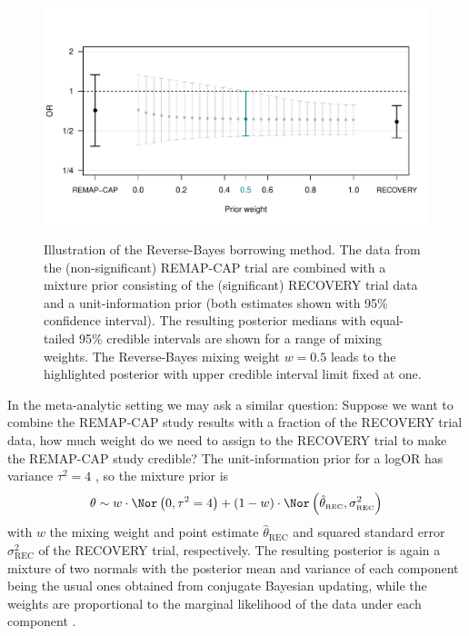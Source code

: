 \begin{figure}[!htb]
\begin{knitrout}
  \color{fgcolor}
{\centering \includegraphics[width=\maxwidth]{images/paper4/advocacy-borrowing-1}
}
\end{knitrout}
\caption{Illustration of the Reverse-Bayes borrowing method. The data from the
  (non-significant) REMAP-CAP trial are combined with a mixture prior consisting
  of the (significant) RECOVERY trial data and a unit-information prior (both
  estimates shown with 95\% confidence interval). The resulting posterior
  medians with equal-tailed 95\% credible intervals are shown for a range of
  mixing weights. The Reverse-Bayes mixing weight $w = 0.5$ leads to the
  highlighted posterior with upper credible interval limit fixed at one.}
\label{fig4:borrowing}
\end{figure}
In the meta-analytic setting we may ask a similar question: Suppose we want to
combine the REMAP-CAP study results with a fraction of the RECOVERY trial data,
how much weight do we need to assign to the RECOVERY trial to make the REMAP-CAP
study credible? The unit-information prior for a logOR has variance
$\tau^{2} = 4$ \citep[section 2.4.1]{Spiegelhalter2004}, so the mixture prior is
\begin{align*}
  \theta \sim w \cdot \Nor\left(0, \tau^{2} = 4\right) + (1 - w) \cdot
  \Nor\left( \hat{\theta}_{\scriptscriptstyle \text{REC}},
  \sigma^{2}_{\scriptscriptstyle \text{REC}}\right)
\end{align*}
with $w$ the mixing weight and point estimate
$\hat{\theta}_{\scriptscriptstyle \text{REC}}$ and squared standard error
$\sigma^{2}_{\scriptscriptstyle \text{REC}}$ of the RECOVERY trial,
respectively. The resulting posterior is again a mixture of two normals with the
posterior mean and variance of each component being the usual ones obtained from
conjugate Bayesian updating, while the weights are proportional to the marginal
likelihood of the data under each component \citep[section 3.5]{Best2021}.

